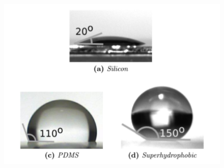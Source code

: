 \documentclass[letterpaper,12pt]{article}
\begin{document}
\begin{figure}[h!] 
	\centering \includegraphics[width=0.8\columnwidth]{gocce_sessili.PNG}
	\label{chiappe}
\end{figure}
\end{document}
